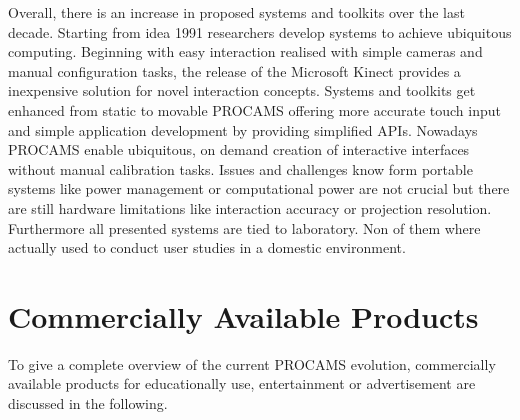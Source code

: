 Overall, there is an increase in proposed systems and toolkits over the last decade. Starting from \citeauthor{Wellner:1993vh} idea 1991 researchers develop systems to achieve ubiquitous computing. Beginning with easy interaction realised with simple cameras and manual configuration tasks, the release of the Microsoft Kinect provides a inexpensive solution for novel interaction concepts. Systems and toolkits get enhanced from static to movable \ac{PROCAMS} offering more accurate touch input and simple application development by providing simplified APIs. Nowadays \ac{PROCAMS} enable ubiquitous, on demand creation of interactive interfaces without manual calibration tasks. 
Issues and challenges know form portable systems like power management or computational power are not crucial but there are still  hardware limitations like interaction accuracy or projection resolution. Furthermore all presented systems are tied to laboratory. Non of them where actually used to conduct user studies in a domestic environment. 

\section{Commercially Available Products}

To give a complete overview of the current PROCAMS evolution, commercially available products for educationally use, entertainment or advertisement are discussed in the following.

